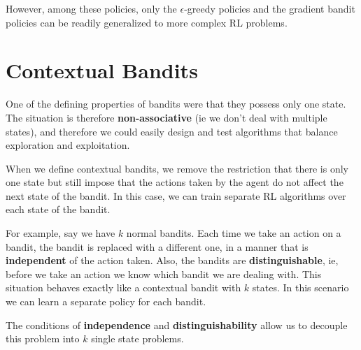 \documentclass[12pt]{report}
\begin{document}
However, among these policies, only the $\epsilon$-greedy policies and the gradient bandit policies can be readily generalized to more complex RL problems.

\section{Contextual Bandits}
One of the defining properties of bandits were that they possess only one state. The situation is therefore \textbf{non-associative} (ie we don't deal with multiple states), and therefore we could easily design 
and test algorithms that balance exploration and exploitation.

When we define contextual bandits, we remove the restriction that there is only one state but still impose that the actions taken by the agent do not affect the next state of the bandit. In this case, we can train separate RL algorithms 
over each state of the bandit.

For example, say we have $k$ normal bandits. Each time we take an action on a bandit, the bandit is replaced with a different one, in a manner that is \textbf{independent} of the action taken. Also, the bandits are \textbf{distinguishable}, 
ie, before we take an action we know which bandit we are dealing with. This situation behaves exactly like a contextual bandit with $k$ states. In this scenario we can learn a separate policy for each bandit.

The conditions of \textbf{independence} and \textbf{distinguishability} allow us to decouple this problem into $k$ single state problems.
\end{document}
